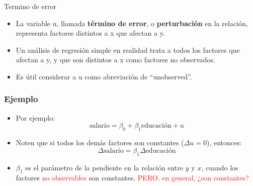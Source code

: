 \documentclass{beamer}
\begin{document}
\begin{frame}{Termino de error}

\begin{itemize}
    \item  La variable u, llamada {\bf  término de error}, o {\bf perturbación} en la relación, representa factores
distintos a x que afectan a y.
      \item Un análisis de regresión simple en realidad trata a todos los factores
que afectan a y, y que son distintos a x como factores no observados.
        \item Es útil considerar a u
como abreviación de “unobserved”. 
\end{itemize}
    
\end{frame}
\begin{frame}
	\frametitle{Ejemplo} %
    \begin{itemize}
        \item Por ejemplo:
        \begin{equation*}
            \text{salario} = \beta_0 + \beta_1 \text{educación} + u
        \end{equation*}
        \item Noten que si todos los demás factores son constantes ($\Delta u = 0$), entonces:
        \begin{equation*}
            \Delta \text{salario} = \beta_1 \Delta \text{educación}
        \end{equation*}
        \item $\beta_1$ es el parámetro de la pendiente en la relación entre $y$ y $x$, cuando los factores \textcolor{red}{no observables} son constantes. \textcolor{red}{PERO, en general, ¿son constantes?}
    \end{itemize}
\end{frame}	
\end{document}
